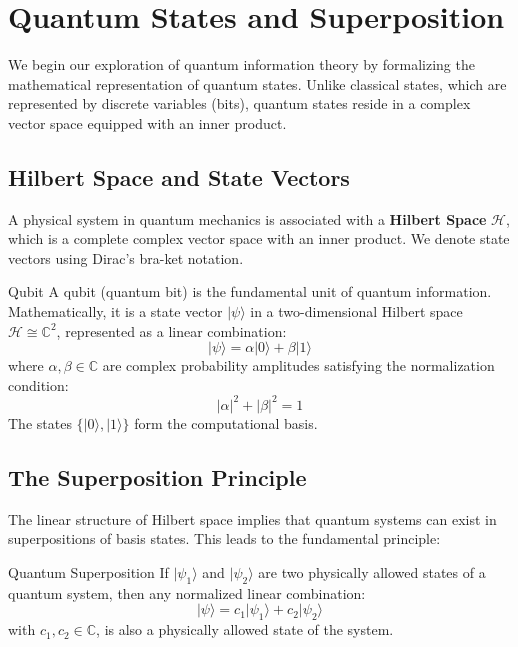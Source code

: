 \chapter{Quantum States and Superposition}

We begin our exploration of quantum information theory by formalizing the mathematical representation of quantum states. Unlike classical states, which are represented by discrete variables (bits), quantum states reside in a complex vector space equipped with an inner product.

\section{Hilbert Space and State Vectors}

A physical system in quantum mechanics is associated with a \textbf{Hilbert Space} \(\mathcal{H}\), which is a complete complex vector space with an inner product. We denote state vectors using Dirac's bra-ket notation.

\begin{definitionbox}{Qubit}
A qubit (quantum bit) is the fundamental unit of quantum information. Mathematically, it is a state vector \(|\psi\rangle\) in a two-dimensional Hilbert space \(\mathcal{H} \cong \mathbb{C}^2\), represented as a linear combination:
\[
|\psi\rangle = \alpha|0\rangle + \beta|1\rangle
\]
where \(\alpha, \beta \in \mathbb{C}\) are complex probability amplitudes satisfying the normalization condition:
\[
|\alpha|^2 + |\beta|^2 = 1
\]
The states \(\{|0\rangle, |1\rangle\}\) form the computational basis.
\end{definitionbox}

\section{The Superposition Principle}

The linear structure of Hilbert space implies that quantum systems can exist in superpositions of basis states. This leads to the fundamental principle:

\begin{theorembox}{Quantum Superposition}
If \(|\psi_1\rangle\) and \(|\psi_2\rangle\) are two physically allowed states of a quantum system, then any normalized linear combination:
\[
|\psi\rangle = c_1|\psi_1\rangle + c_2|\psi_2\rangle
\]
with \(c_1, c_2 \in \mathbb{C}\), is also a physically allowed state of the system.
\end{theorembox}

